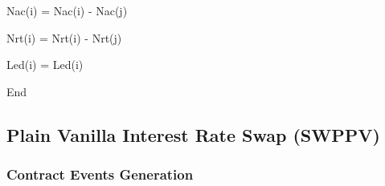 \documentclass[9pt,oneside]{amsart}
\begin{document}
\begin{adjustwidth}{0.5in}{0.0in}
Nac(i) = Nac(i) - Nac(j)\par

\end{adjustwidth}

\begin{adjustwidth}{0.5in}{0.0in}
Nrt(i) = Nrt(i) - Nrt(j)\par

\end{adjustwidth}

\begin{adjustwidth}{0.5in}{0.0in}
Led(i) = Led(i)\par

\end{adjustwidth}

End

\subsection{Plain Vanilla Interest Rate Swap (SWPPV)}
\subsubsection{Contract Events Generation}


\end{document}
